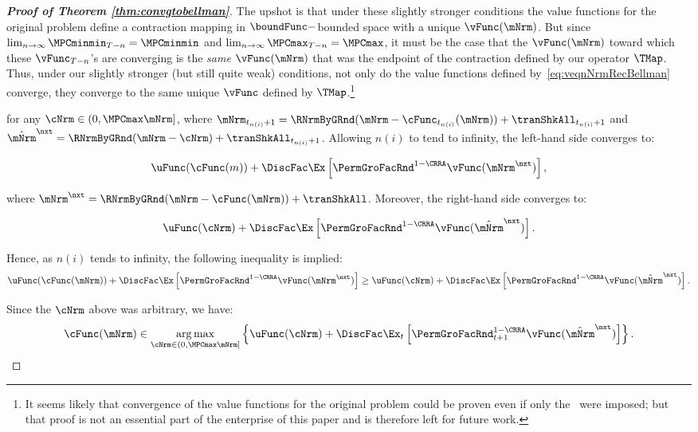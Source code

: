 \documentclass[\econtexRoot/BufferStockTheory]{subfiles}
\begin{document}
\begin{proof}[\textbf{Proof of Theorem \ref{thm:convgtobellman}}]
The upshot is that under these slightly stronger conditions the value functions for the original problem define a contraction mapping in $\boundFunc-$bounded space with a unique $\vFunc(\mNrm)$.
But since $\lim_{n \rightarrow \infty} \MPCminmin_{T-n} = \MPCminmin$ and $\lim_{n \rightarrow \infty} \MPCmax_{T-n} = \MPCmax$, it must be the case that the $\vFunc(\mNrm)$ toward which these $\vFunc_{T-n}$'s are converging is the \textit{same} $\vFunc(\mNrm)$ that was the endpoint of the contraction defined by our operator $\TMap$.
Thus, under our slightly stronger (but still quite weak) conditions, not only do the value functions defined by~\eqref{eq:veqnNrmRecBellman} converge, they converge to the same unique $\vFunc$ defined by $\TMap$.\footnote{It seems likely that convergence of the value functions for the original problem could be proven even if only the \WRIC~were imposed; but that proof is not an essential part of the enterprise of this paper and is therefore left for future work.}

for any $\cNrm \in (0, \MPCmax \mNrm]$, where $\mNrm_{t_{n(i)}+1} = \RNrmByGRnd(\mNrm - \cFunc_{t_{n(i)}}(\mNrm)) + \tranShkAll_{t_{n(i)}+1}$ and $\hat{\mNrm}^{\nxt} = \RNrmByGRnd(\mNrm - \cNrm) + \tranShkAll_{t_{n(i)}+1}$.
Allowing $n(i)$ to tend to infinity, the left-hand side converges to:
 
\begin{equation}
\uFunc(\cFunc(m)) + \DiscFac \Ex \left[ {\PermGroFacRnd}^{1 - \CRRA} \vFunc(\mNrm^{\nxt}) \right],
\end{equation}

where $\mNrm^{\nxt} = \RNrmByGRnd(\mNrm - \cFunc(\mNrm)) + \tranShkAll$.
Moreover, the right-hand side converges to:

\begin{equation}
\uFunc(\cNrm) + \DiscFac \Ex \left[ {\PermGroFacRnd}^{1 - \CRRA} \vFunc(\hat{\mNrm}^{\nxt}) \right].
\end{equation}

Hence, as $n(i)$ tends to infinity, the following inequality is implied:
\begin{equation}
\uFunc(\cFunc(\mNrm)) + \DiscFac \Ex \left[ {\PermGroFacRnd}^{1 - \CRRA} \vFunc(\mNrm^{\nxt}) \right] \geq \uFunc(\cNrm) + \DiscFac \Ex \left[ {\PermGroFacRnd}^{1 - \CRRA} \vFunc(\hat{\mNrm}^{\nxt}) \right].
\end{equation}

Since the $\cNrm$ above was arbitrary, we have:
\begin{equation}
\cFunc(\mNrm) \in \underset{\cNrm \in (0, \MPCmax \mNrm]}{\arg \max} \left\{ \uFunc(\cNrm) + \DiscFac \Ex_t \left[ {\PermGroFacRnd}_{t + 1}^{1 - \CRRA} \vFunc(\hat{\mNrm}^{\nxt}) \right] \right\}.
\end{equation}


\end{proof}
\end{document}
